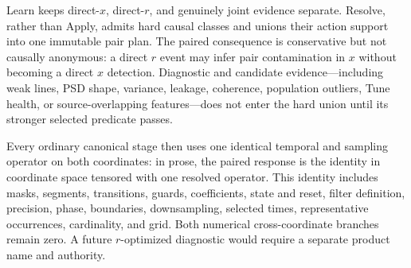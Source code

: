 \documentclass[10pt]{article}
\begin{document}
\begin{center}
\end{center}

Learn keeps direct-$x$, direct-$r$, and genuinely joint evidence separate.
Resolve, rather than Apply, admits hard causal classes and unions their action
support into one immutable pair plan.  The paired consequence is conservative
but not causally anonymous: a direct $r$ event may infer pair contamination in
$x$ without becoming a direct $x$ detection.  Diagnostic and candidate
evidence---including weak lines, PSD shape, variance, leakage, coherence,
population outliers, Tune health, or source-overlapping features---does not
enter the hard union until its stronger selected predicate passes.

Every ordinary canonical stage then uses one identical temporal and sampling
operator on both coordinates: in prose, the paired response is the identity
in coordinate space tensored with one resolved operator.  This identity
includes masks, segments, transitions, guards, coefficients, state and reset,
filter definition, precision, phase, boundaries, downsampling, selected
times, representative occurrences, cardinality, and grid.  Both numerical
cross-coordinate branches remain zero.  A future $r$-optimized diagnostic
would require a separate product name and authority.
\end{document}
